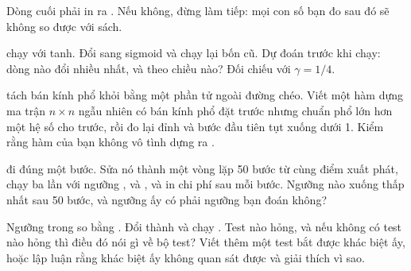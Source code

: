 Dòng cuối phải in ra . Nếu không, đừng làm tiếp: mọi con số
bạn đo sau đó sẽ không so được với sách.

\begin{bt}
  \item {} chạy với tanh. Đổi sang sigmoid và
    chạy lại bốn  cũ. Dự đoán trước khi chạy: dòng nào đổi nhiều
    nhất, và theo chiều nào? Đối chiếu với \(\gamma = 1/4\).

  \item {} tách bán kính phổ khỏi  bằng
    một phần tử ngoài đường chéo. Viết một hàm dựng ma trận \(n \times n\) ngẫu
    nhiên có bán kính phổ đặt trước nhưng chuẩn phổ lớn hơn một hệ số cho trước,
    rồi đo lại đỉnh và bước đầu tiên tụt xuống dưới 1. Kiểm rằng hàm của bạn
    không vô tình dựng ra .

  \item {} đi đúng một bước. Sửa nó thành một
    vòng lặp 50 bước từ cùng điểm xuất phát, chạy ba lần với ngưỡng
    ,  và , và in chi phí sau mỗi bước. Ngưỡng
    nào xuống thấp nhất sau 50 bước, và ngưỡng ấy có phải ngưỡng bạn đoán
    không?

  \item Ngưỡng trong  so bằng \code{>=}. Đổi thành \code{>} và
    chạy . Test nào hỏng, và nếu không có test nào
    hỏng thì điều đó nói gì về bộ test? Viết thêm một test bắt được khác biệt
    ấy, hoặc lập luận rằng khác biệt ấy không quan sát được và giải thích vì
    sao.
\end{bt}

\tierextend

